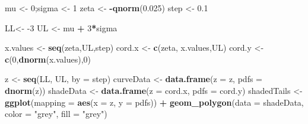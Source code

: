 \documentclass[
]{book}
\newenvironment{Shaded}{\begin{snugshade}}{\end{snugshade}}
\newcommand{\DataTypeTok}[1]{\textcolor[rgb]{0.13,0.29,0.53}{#1}}
\newcommand{\DecValTok}[1]{\textcolor[rgb]{0.00,0.00,0.81}{#1}}
\newcommand{\FloatTok}[1]{\textcolor[rgb]{0.00,0.00,0.81}{#1}}
\newcommand{\KeywordTok}[1]{\textcolor[rgb]{0.13,0.29,0.53}{\textbf{#1}}}
\newcommand{\NormalTok}[1]{#1}
\newcommand{\OperatorTok}[1]{\textcolor[rgb]{0.81,0.36,0.00}{\textbf{#1}}}
\newcommand{\StringTok}[1]{\textcolor[rgb]{0.31,0.60,0.02}{#1}}
\begin{document}
\begin{Shaded}
\begin{Highlighting}[]
\NormalTok{mu \textless{}{-}}\StringTok{ }\DecValTok{0}\NormalTok{;sigma \textless{}{-}}\StringTok{ }\DecValTok{1}
\NormalTok{zeta \textless{}{-}}\StringTok{ }\OperatorTok{{-}}\KeywordTok{qnorm}\NormalTok{(}\FloatTok{0.025}\NormalTok{)}
\NormalTok{step \textless{}{-}}\StringTok{ }\FloatTok{0.1}

\NormalTok{LL\textless{}{-}}\StringTok{ }\DecValTok{{-}3}
\NormalTok{UL \textless{}{-}}\StringTok{ }\NormalTok{mu }\OperatorTok{+}\StringTok{ }\DecValTok{3}\OperatorTok{*}\NormalTok{sigma}

\NormalTok{x.values \textless{}{-}}\StringTok{ }\KeywordTok{seq}\NormalTok{(zeta,UL,step)}
\NormalTok{cord.x \textless{}{-}}\StringTok{ }\KeywordTok{c}\NormalTok{(zeta, x.values,UL) }
\NormalTok{cord.y \textless{}{-}}\StringTok{ }\KeywordTok{c}\NormalTok{(}\DecValTok{0}\NormalTok{,}\KeywordTok{dnorm}\NormalTok{(x.values),}\DecValTok{0}\NormalTok{) }

\NormalTok{z \textless{}{-}}\StringTok{ }\KeywordTok{seq}\NormalTok{(LL, UL, }\DataTypeTok{by =}\NormalTok{ step)}
\NormalTok{curveData \textless{}{-}}\StringTok{ }\KeywordTok{data.frame}\NormalTok{(}\DataTypeTok{z =}\NormalTok{ z, }\DataTypeTok{pdfs =} \KeywordTok{dnorm}\NormalTok{(z))}
\NormalTok{shadeData \textless{}{-}}\StringTok{ }\KeywordTok{data.frame}\NormalTok{(}\DataTypeTok{z =}\NormalTok{ cord.x, }\DataTypeTok{pdfs =}\NormalTok{ cord.y)}
\NormalTok{shadedTails \textless{}{-}}\StringTok{ }\KeywordTok{ggplot}\NormalTok{(}\DataTypeTok{mapping =} \KeywordTok{aes}\NormalTok{(}\DataTypeTok{x =}\NormalTok{ z, }\DataTypeTok{y =}\NormalTok{ pdfs))  }\OperatorTok{+}\StringTok{ }
\StringTok{  }\KeywordTok{geom\_polygon}\NormalTok{(}\DataTypeTok{data =}\NormalTok{ shadeData, }\DataTypeTok{color =} \StringTok{"grey"}\NormalTok{, }\DataTypeTok{fill =} \StringTok{"grey"}\NormalTok{)}


\end{Highlighting}
\end{Shaded}
\end{document}
